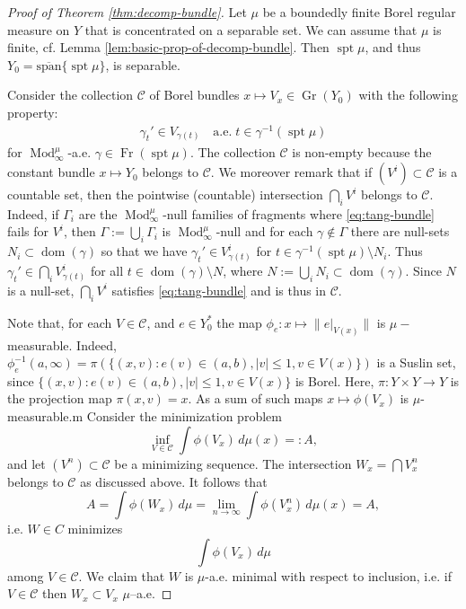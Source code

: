 \documentclass{amsart}
\numberwithin{equation}{section}
\newcommand{\spt}{\operatorname{spt}}
\newcommand{\Mod}{\operatorname{Mod}}
\newcommand{\dom}{\operatorname{dom}}
\newcommand{\Fr}{\operatorname{Fr}}
\newcommand{\inv}{^{-1}}
\begin{document}
\begin{proof}[Proof of Theorem \ref{thm:decomp-bundle}]
Let $\mu$ be a boundedly finite Borel regular measure on $Y$  that is concentrated on a separable set. We can assume that $\mu$ is finite, cf. Lemma \ref{lem:basic-prop-of-decomp-bundle}. Then $\spt\mu$, and thus $Y_0 = \overline{\mbox{span}}\{\spt\mu\}$, is separable.

Consider the collection $\mathcal C$ of Borel bundles $x \mapsto V_x \in \operatorname{Gr}(Y_0)$ with the following property:
\begin{align}\label{eq:tang-bundle}
\gamma_t'\in V_{\gamma(t)}\quad \mbox{a.e.}\; t\in \gamma\inv(\spt\mu)    
\end{align}
for $\Mod_\infty^\mu$-a.e. $\gamma\in \Fr(\spt\mu)$. The collection $\mathcal C$ is non-empty because the constant bundle $x\mapsto Y_0$ belongs to $\mathcal C$. We moreover remark that if $(V^i)\subset \mathcal C$ is a countable set, then the pointwise (countable) intersection $\displaystyle \bigcap_iV^i$ belongs to $\mathcal C$. Indeed, if $\Gamma_i$ are the $\Mod_\infty^\mu$-null families of fragments where \eqref{eq:tang-bundle} fails for $V^i$, then $\Gamma:=\bigcup_i\Gamma_i$ is $\Mod_\infty^\mu$-null and for each $\gamma\notin\Gamma$ there are null-sets $N_i\subset \dom(\gamma)$ so that we have $\gamma_t'\in V_{\gamma(t)}^i$ for $t\in \gamma\inv(\spt\mu)\setminus N_i$.  Thus $\gamma_t'\in \bigcap_iV_{\gamma(t)}^i$ for all $t\in \dom(\gamma)\setminus N$, where $N:=\bigcup_iN_i\subset \dom(\gamma)$. Since $N$ is a null-set, $\bigcap_i V^i$ satisfies \eqref{eq:tang-bundle} and is thus in $\mathcal{C}$.


 Note that, for each $V \in \mathcal C$, and $e\in Y_0^*$ the map $\phi_e:x\mapsto \|e|_{V(x)}\|$ is $\mu-$measurable. Indeed, $\phi_e^{-1}(a,\infty)=\pi(\{(x,v): e(v)\in (a,b), |v|\leq 1, v\in V(x)\})$ is a Suslin set, since $\{(x,v): e(v)\in (a,b), |v|\leq 1, v\in V(x)\}$ is Borel. Here, $\pi:Y\times Y \to Y$ is the projection map $\pi(x,v)=x$. As a sum of such maps $x \mapsto \phi(V_x)$ is $\mu$-measurable.m Consider the minimization problem
\[
\inf_{V \in \mathcal C} \int \phi(V_x)\, d\mu(x) =: A,
\]
and let $(V^n) \subset \mathcal C$ be a minimizing sequence. The intersection $W_x = \bigcap V^n_x$ belongs to $\mathcal C$ as discussed above. It follows
that
\[
A = \int \phi(W_x)\, d\mu = \lim_{n\to\infty} \int \phi(V^n_x)\, d\mu(x) = A,
\]
i.e. $W \in C$ minimizes
\[
\int \phi(V_x)\, d\mu
\]
among $V \in \mathcal C$. We claim that $W$ is $\mu$-a.e. minimal with respect to inclusion, i.e. if $V \in \mathcal C$ then $W_x \subset V_x$ $\mu$–a.e.


\end{proof}
\end{document}
